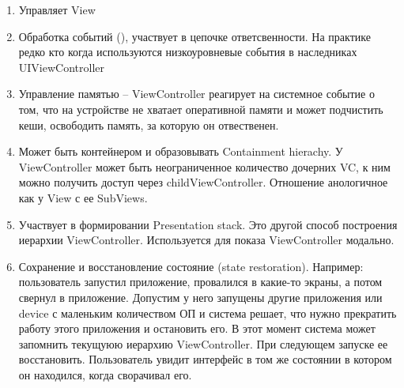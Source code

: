 \documentclass{article}
\begin{document}
    \begin{enumerate}
        \item Управляет View
        \item Обработка событий (), участвует в цепочке ответсвенности. На практике редко кто когда используются низкоуровневые события в наследниках UIViewController
        \item Управление памятью -- ViewController реагирует на системное событие о том, что на устройстве не хватает оперативной памяти и может подчистить кеши, освободить память, за которую он отвественен. 
        \item  Может быть контейнером и образовывать Containment hierachy. У ViewController может быть неограниченное количество дочерних VC, к ним можно получить доступ через childViewController. Отношение анологичное как у View с ее SubViews.
        \item Участвует в формировании Presentation stack. Это другой способ построения иерархии ViewController. Используется для показа ViewController модально. 
        \item Сохранение и восстановление состояние (state restoration). Например: пользователь запустил приложение, провалился в какие-то экраны, а потом свернул в приложение. Допустим у него запущены другие приложения или device с маленьким количеством ОП и система решает, что нужно прекратить работу этого приложения и остановить его. В этот момент система может запомнить текущуюю иерархию ViewController. При следующем запуске ее восстановить. Пользователь увидит интерфейс в том же состоянии в котором он находился, когда сворачивал его. 
        \end{enumerate}
\end{document}
